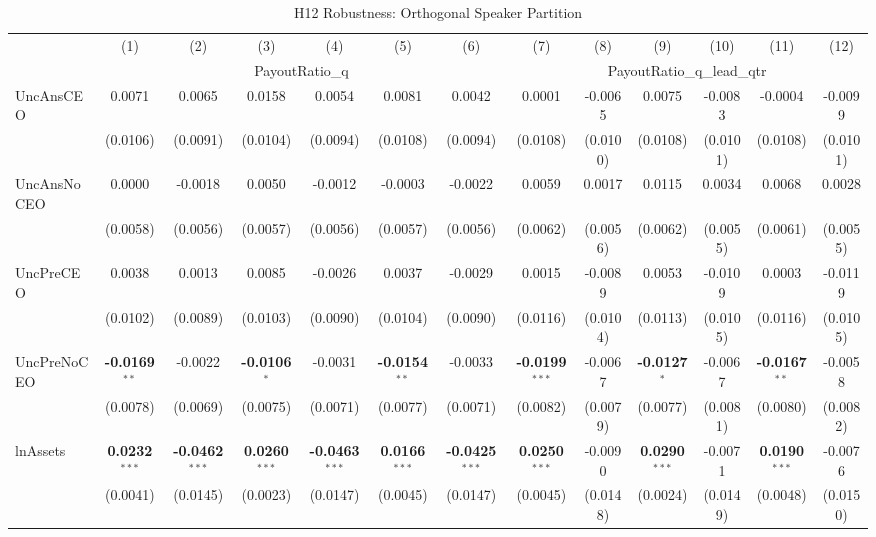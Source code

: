 \begin{landscape}
\begin{table}[H]
\setlength{\tabcolsep}{3pt}
\renewcommand{\arraystretch}{0.85}
\centering
\caption{H12 Robustness: Orthogonal Speaker Partition}
\label{tab:h12_robust}
\scriptsize
\begin{tabular}{lcccccccccccc}
\toprule
 & (1) & (2) & (3) & (4) & (5) & (6) & (7) & (8) & (9) & (10) & (11) & (12) \\
 & \multicolumn{6}{c}{PayoutRatio\_q} & \multicolumn{6}{c}{PayoutRatio\_q\_lead\_qtr} \\
\cmidrule(lr){2-7} \cmidrule(lr){8-13}
\midrule
UncAnsCEO & 0.0071 & 0.0065 & 0.0158 & 0.0054 & 0.0081 & 0.0042 & 0.0001 & -0.0065 & 0.0075 & -0.0083 & -0.0004 & -0.0099 \\
 & (0.0106) & (0.0091) & (0.0104) & (0.0094) & (0.0108) & (0.0094) & (0.0108) & (0.0100) & (0.0108) & (0.0101) & (0.0108) & (0.0101) \\
UncAnsNoCEO & 0.0000 & -0.0018 & 0.0050 & -0.0012 & -0.0003 & -0.0022 & 0.0059 & 0.0017 & 0.0115 & 0.0034 & 0.0068 & 0.0028 \\
 & (0.0058) & (0.0056) & (0.0057) & (0.0056) & (0.0057) & (0.0056) & (0.0062) & (0.0056) & (0.0062) & (0.0055) & (0.0061) & (0.0055) \\
UncPreCEO & 0.0038 & 0.0013 & 0.0085 & -0.0026 & 0.0037 & -0.0029 & 0.0015 & -0.0089 & 0.0053 & -0.0109 & 0.0003 & -0.0119 \\
 & (0.0102) & (0.0089) & (0.0103) & (0.0090) & (0.0104) & (0.0090) & (0.0116) & (0.0104) & (0.0113) & (0.0105) & (0.0116) & (0.0105) \\
UncPreNoCEO & \textbf{-0.0169}$^{**}$ & -0.0022 & \textbf{-0.0106}$^{*}$ & -0.0031 & \textbf{-0.0154}$^{**}$ & -0.0033 & \textbf{-0.0199}$^{***}$ & -0.0067 & \textbf{-0.0127}$^{*}$ & -0.0067 & \textbf{-0.0167}$^{**}$ & -0.0058 \\
 & (0.0078) & (0.0069) & (0.0075) & (0.0071) & (0.0077) & (0.0071) & (0.0082) & (0.0079) & (0.0077) & (0.0081) & (0.0080) & (0.0082) \\
\midrule
lnAssets & \textbf{0.0232}$^{***}$ & \textbf{-0.0462}$^{***}$ & \textbf{0.0260}$^{***}$ & \textbf{-0.0463}$^{***}$ & \textbf{0.0166}$^{***}$ & \textbf{-0.0425}$^{***}$ & \textbf{0.0250}$^{***}$ & -0.0090 & \textbf{0.0290}$^{***}$ & -0.0071 & \textbf{0.0190}$^{***}$ & -0.0076 \\
 & (0.0041) & (0.0145) & (0.0023) & (0.0147) & (0.0045) & (0.0147) & (0.0045) & (0.0148) & (0.0024) & (0.0149) & (0.0048) & (0.0150) \\

\end{tabular}
\end{table}
\end{landscape}
